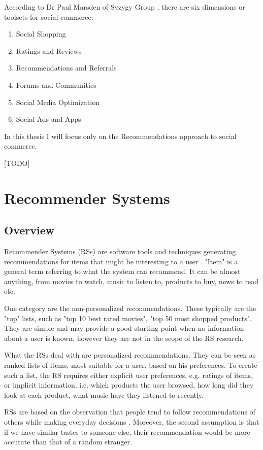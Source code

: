 \documentclass[12pt]{report}
\begin{document}
According to Dr Paul Marsden of Syzygy Group \cite{social_commerce_syzygy}, there are six dimensions or toolsets for social commerce:
\begin{enumerate}
\item Social Shopping
\item Ratings and Reviews
\item Recommendations and Referrals
\item Forums and Communities
\item Social Media Optimization
\item Social Ads and Apps
\end{enumerate}

In this thesis I will focus only on the Recommendations approach to social commerce.

[TODO]

\section{Recommender Systems}

\subsection{Overview}

Recommender Systems (RSs) are software tools and techniques generating recommendations for items that might be interesting to a user \cite{rec_sys_handbook}. "Item" is a general term referring to what the system can recommend. It can be almost anything, from movies to watch, music to listen to, products to buy, news to read etc.

One category are the non-personalized recommendations. These typically are the "top" lists, such as "top 10 best rated movies", "top 50 most shopped products". They are simple and may provide a good starting point when no information about a user is known, however they are not in the scope of the RS research.

What the RSs deal with are personalized recommendations. They can be seen as ranked lists of items, most suitable for a user, based on his preferences. To create such a list, the RS requires either explicit user preferences, e.g. ratings of items, or implicit information, i.e. which products the user browsed, how long did they look at each product, what music have they listened to recently.

RSs are based on the observation that people tend to follow recommendations of others while making everyday decisions \cite{rec_sys_handbook}. Moreover, the second assumption is that if we have similar tastes to someone else, their recommendation would be more accurate than that of a random stranger.
\end{document}
